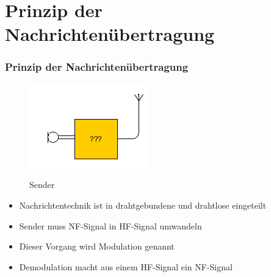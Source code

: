 

\subtitle{Technik Klasse E 14: \\
  Modulation \& Demodulation \\[2em]}
\date{Stand 05.12.2016}


\section*{Prinzip der Nachrichtenübertragung}
\begin{frame}
  \frametitle{Prinzip der Nachrichtenübertragung}
  \begin{center}
    \begin{figure}
      \includegraphics[width=\textwidth,height=.45\textheight,keepaspectratio]{e14/Sender.png}\\
      \caption{Sender}
    \end{figure}
  \end{center}
  \begin{itemize}
    \item Nachrichtentechnik ist in drahtgebundene und drahtlose eingeteilt
    \item Sender muss NF-Signal in HF-Signal umwandeln
    \item Dieser Vorgang wird Modulation genannt
    \item Demodulation macht aus einem HF-Signal ein NF-Signal
  \end{itemize}
\end{frame}

